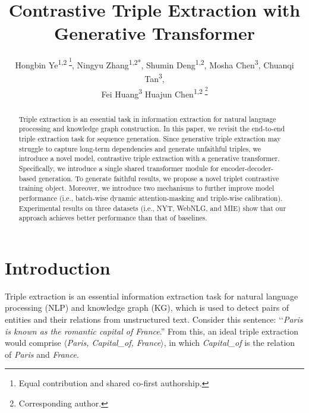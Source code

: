 \documentclass[letterpaper]{article} \usepackage{aaai21}  \usepackage{times}  \usepackage{helvet} \usepackage{courier}  \usepackage[hyphens]{url}  \usepackage{graphicx} \urlstyle{rm} \def\UrlFont{\rm}  \usepackage{natbib}  \usepackage[noend]{algpseudocode}
\title{Contrastive Triple Extraction with Generative Transformer}
\author {
Hongbin Ye\textsuperscript{\rm 1,2 \footnote{Equal contribution and shared co-first authorship.}},
        Ningyu Zhang\textsuperscript{\rm 1,2*\dag},
        Shumin Deng\textsuperscript{\rm 1,2},
        Mosha Chen\textsuperscript{\rm 3},
        Chuanqi Tan\textsuperscript{\rm 3}, \\
        Fei Huang\textsuperscript{\rm 3}
        Huajun Chen\textsuperscript{\rm 1,2 \footnote{Corresponding author.}}
        \\
}
\begin{document}
\maketitle

\begin{abstract}
Triple extraction is an essential task in information extraction for natural language processing and knowledge graph construction. In this paper, we revisit the end-to-end triple extraction task for sequence generation. Since generative triple extraction may struggle to capture long-term dependencies and generate unfaithful triples, we introduce a novel model, contrastive triple extraction with a generative transformer. Specifically, we introduce a single shared transformer module for encoder-decoder-based generation. To generate faithful results, we propose a novel triplet contrastive training object.  Moreover, we introduce two mechanisms to further improve model performance (i.e., batch-wise dynamic attention-masking and triple-wise calibration).  Experimental results on three datasets (i.e., NYT, WebNLG, and MIE) show that our approach achieves better performance than that of baselines. \end{abstract}
\section{Introduction}
Triple extraction is an essential information extraction task for natural language processing (NLP) and knowledge graph (KG), which is used to detect pairs of entities and their relations from unstructured text. Consider this sentence: ‘‘\emph{Paris is known as the romantic capital of France}.'' From this, an ideal triple extraction would comprise {\it $\langle$Paris, Capital\_of, France$\rangle$}, in which {\it Capital\_of} is the relation of {\it Paris} and {\it France}.
\end{document}
